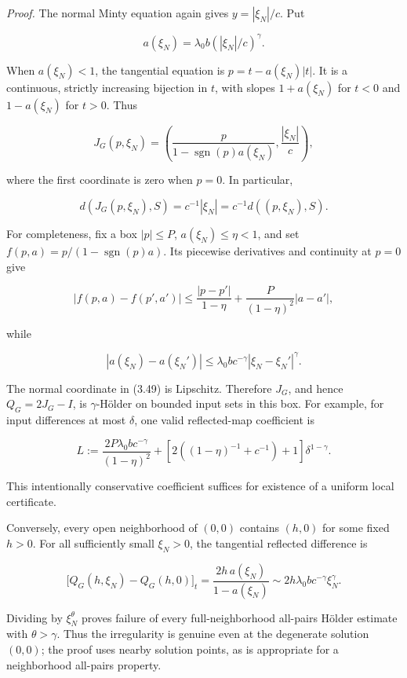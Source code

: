 \documentclass[11pt,a4paper]{article}
\theoremstyle{plain}
\theoremstyle{definition}
\theoremstyle{remark}
\begin{document}
\emph{Proof.} The normal Minty equation again gives \(y=|\xi_N|/c\). Put

\[
a(\xi_N)=\lambda_0b(|\xi_N|/c)^\gamma.
\]

When \(a(\xi_N)<1\), the tangential equation is \(p=t-a(\xi_N)|t|\). It
is a continuous, strictly increasing bijection in \(t\), with slopes
\(1+a(\xi_N)\) for \(t<0\) and \(1-a(\xi_N)\) for \(t>0\). Thus

\[
J_G(p,\xi_N)=
\left(
\frac{p}{1-\operatorname{sgn}(p)a(\xi_N)},\frac{|\xi_N|}{c}
\right),
\tag{3.49}
\]

where the first coordinate is zero when \(p=0\). In particular,

\[
d(J_G(p,\xi_N),S)=c^{-1}|\xi_N|=c^{-1}d((p,\xi_N),S).
\tag{3.50}
\]

For completeness, fix a box \(|p|\le P\), \(a(\xi_N)\le\eta<1\), and set
\(f(p,a)=p/(1-\operatorname{sgn}(p)a)\). Its piecewise derivatives and
continuity at \(p=0\) give

\[
|f(p,a)-f(p',a')|
\le\frac{|p-p'|}{1-\eta}
+\frac{P}{(1-\eta)^2}|a-a'|,
\tag{3.51}
\]

while

\[
|a(\xi_N)-a(\xi_N')|
\le\lambda_0bc^{-\gamma}|\xi_N-\xi_N'|^\gamma.
\]

The normal coordinate in (3.49) is Lipschitz. Therefore \(J_G\), and
hence \(Q_G=2J_G-I\), is \(\gamma\)-Hölder on bounded input sets in this
box. For example, for input differences at most \(\delta\), one valid
reflected-map coefficient is

\[
L:=
\frac{2P\lambda_0bc^{-\gamma}}{(1-\eta)^2}
+\left[2\left((1-\eta)^{-1}+c^{-1}\right)+1\right]\delta^{1-\gamma}.
\tag{3.52}
\]

This intentionally conservative coefficient suffices for existence of a
uniform local certificate.

Conversely, every open neighborhood of \((0,0)\) contains \((h,0)\) for
some fixed \(h>0\). For all sufficiently small \(\xi_N>0\), the
tangential reflected difference is

\[
\bigl[Q_G(h,\xi_N)-Q_G(h,0)\bigr]_t
=\frac{2h\,a(\xi_N)}{1-a(\xi_N)}
\sim2h\lambda_0bc^{-\gamma}\xi_N^\gamma.
\tag{3.53}
\]

Dividing by \(\xi_N^\theta\) proves failure of every full-neighborhood
all-pairs Hölder estimate with \(\theta>\gamma\). Thus the irregularity
is genuine even at the degenerate solution \((0,0)\); the proof uses
nearby solution points, as is appropriate for a neighborhood all-pairs
property.
\end{document}
